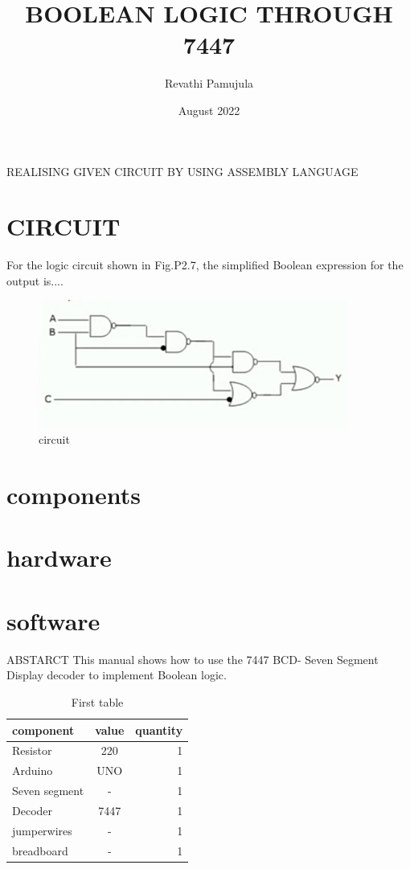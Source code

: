 \documentclass{article}
\title{BOOLEAN LOGIC THROUGH 7447}
\author{Revathi Pamujula}
\date{August 2022}
\begin{document}
\maketitle
REALISING GIVEN CIRCUIT BY USING ASSEMBLY LANGUAGE
\section{CIRCUIT}

For the logic circuit shown in Fig.P2.7, the simplified Boolean expression for the output is....\\
\begin{figure}
    \centering
    \includegraphics[width=4in]{boolean.jpg}
    \caption{circuit}
    \label{fig:circuit}
\end{figure}
\section{components}
\section{hardware}
\section{software}
ABSTARCT This manual shows how to use the 7447 BCD-
Seven Segment Display decoder to implement Boolean logic.\\



 \begin{table}[ht]
            \centering
            \begin{tabular}{|l|c|r|}
            \hline
        component & value & quantity\\
        \hline

Resistor & 220 & 1\\
\hline
Arduino & UNO & 1\\
\hline
Seven segment & - & 1\\
\hline
Decoder & 7447& 1\\
\hline
jumperwires & - & 1\\
\hline
breadboard & - & 1\\
\hline
\end{tabular}
\caption{First table}
\label{tab:first table}
\end{table}
\end{document}
